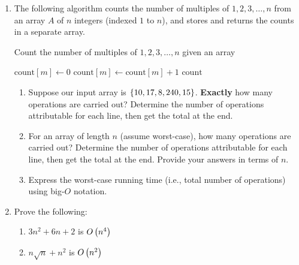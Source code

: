 \begin{exercises}
\begin{enumerate}
    \item The following algorithm counts the number of multiples of $1, 2, 3, \ldots, n$ from an array $A$ of $n$ integers (indexed $1$ to $n$), and stores and returns the counts in a separate array.
    \begin{algorithm}[H]
        \caption{Count the number of multiples of $1, 2, 3, \ldots, n$ given an array}
        \begin{algorithmic}[1]
                \State $\mathrm{count}[m] \gets 0$
            \EndFor
                        \State $\mathrm{count}[m] \gets \mathrm{count}[m] + 1$
                    \EndIf
                \EndFor
            \EndFor
            \Return $\mathrm{count}$
            \EndFunction
        \end{algorithmic}
    \end{algorithm}
    \begin{enumerate}
        \item Suppose our input array is $\left\{10,17,8,240,15\right\}$. \textbf{Exactly} how many operations are carried out? Determine the number of operations attributable for each line, then get the total at the end.
        \item For an array of length $n$ (assume worst-case), how many operations are carried out? Determine the number of operations attributable for each line, then get the total at the end. Provide your answers in terms of $n$.
        \item Express the worst-case running time (i.e., total number of operations) using big-$O$ notation.
        
    \end{enumerate}
    
    \item Prove the following:
        \begin{enumerate}
            \item $3n^2+6n+2$ is $O\left(n^4 \right)$ 
            \item  $n\sqrt{n} + n^2$ is $O\left(n^2 \right)$
        \end{enumerate}


\end{enumerate}
\end{exercises}
